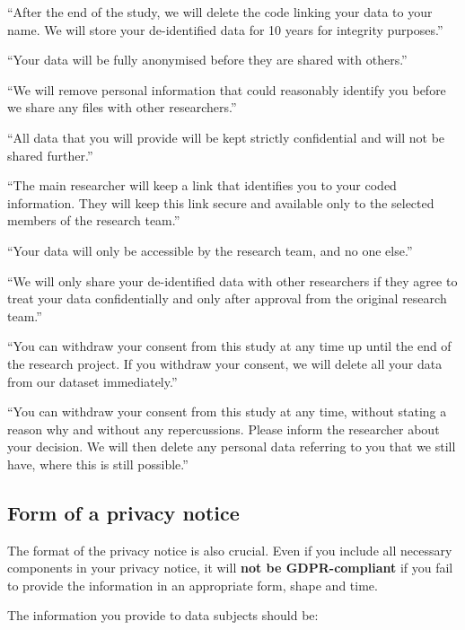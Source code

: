 \documentclass[
]{book}
\begin{document}
``After the end of the study, we will delete the code linking your data to your name. We will store your de-identified data for 10 years for integrity purposes.''

``Your data will be fully anonymised before they are shared with others.''

``We will remove personal information that could reasonably identify you before we share any files with other researchers.''

``All data that you will provide will be kept strictly confidential and will not be shared further.''

``The main researcher will keep a link that identifies you to your coded information. They will keep this link secure and available only to the selected members of the research team.''

``Your data will only be accessible by the research team, and no one else.''

``We will only share your de-identified data with other researchers if they agree to treat your data confidentially and only after approval from the original research team.''

``You can withdraw your consent from this study at any time up until the end of the research project. If you withdraw your consent, we will delete all your data from our dataset immediately.''

``You can withdraw your consent from this study at any time, without stating a reason why and without any repercussions. Please inform the researcher about your decision. We will then delete any personal data referring to you that we still have, where this is still possible.''

\hypertarget{form-of-a-privacy-notice}{%
\subsection{Form of a privacy notice}\label{form-of-a-privacy-notice}}

The format of the privacy notice is also crucial. Even if you include all
necessary components in your privacy notice, it will \textbf{not be GDPR-compliant}
if you fail to provide the information in an appropriate form, shape and time.

The information you provide to data subjects should be:
\end{document}
